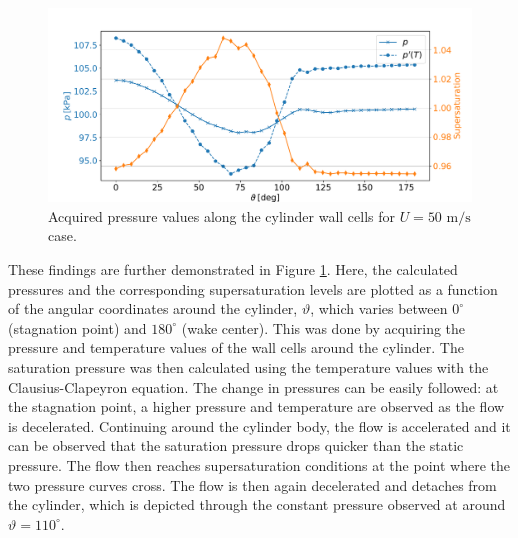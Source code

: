 \documentclass[12pt]{article}
\numberwithin{equation}{section}
\begin{document}
\begin{figure}[H]
    \centering
    \includegraphics[trim={0 0 0 40},clip,width=1\textwidth]{Figures/supersat_angular.pdf}
    \caption{Acquired pressure values along the cylinder wall cells for $U=50$ $\mathrm{m/s}$ case.}
    \label{f:angular_supersat}
\end{figure}
These findings are further demonstrated in Figure \ref{f:angular_supersat}. Here, the calculated pressures and the corresponding supersaturation levels are plotted as a function of the angular coordinates around the cylinder, $\vartheta$, which varies between $0^\circ$ (stagnation point) and $180^\circ$ (wake center). This was done by acquiring the pressure and temperature values of the wall cells around the cylinder. The saturation pressure was then calculated using the temperature values with the Clausius-Clapeyron equation. The change in pressures can be easily followed: at the stagnation point, a higher pressure and temperature are observed as the flow is decelerated. Continuing around the cylinder body, the flow is accelerated and it can be observed that the saturation pressure drops quicker than the static pressure. The flow then reaches supersaturation conditions at the point where the two pressure curves cross. The flow is then again decelerated and detaches from the cylinder, which is depicted through the constant pressure observed at around $\vartheta=110^\circ$.
\end{document}
